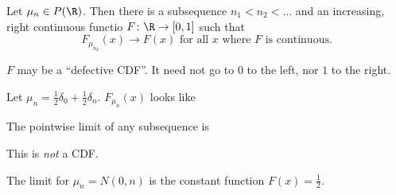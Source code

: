 \begin{theorem} \label{thm:selection}
    Let $\mu_n \in P(\R)$.
    Then there is a subsequence $n_1 < n_2 < \dots$ and an increasing,
    right continuous functio $F\colon \R \to [0, 1]$ such that \[
        F_{\mu_{n_k}}(x) \to F(x) \text{ for all } x \text{ where } F
            \text{ is continuous.}
    \]
\end{theorem}
$F$ may be a ``defective CDF''.
It need not go to $0$ to the left, nor $1$ to the right.
\begin{examples}
    \item Let $\mu_n = \frac12 \delta_0 + \frac12 \delta_n$.
        $F_{\mu_n}(x)$ looks like
        \begin{center}
        \end{center}
        The pointwise limit of any subsequence is
        \begin{center}
        \end{center}
        This is \emph{not} a CDF.
    \item The limit for $\mu_n = N(0, n)$ is the constant function
        $F(x) = \frac12$.
\end{examples}


